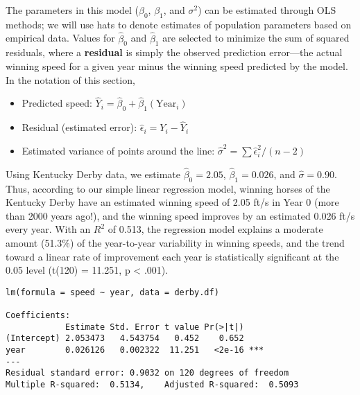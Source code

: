 \documentclass[
]{krantz}
\providecommand{\tightlist}{%
  \setlength{\itemsep}{0pt}\setlength{\parskip}{0pt}}
\begin{document}
The parameters in this model (\(\beta_{0}\), \(\beta_{1}\), and \(\sigma^2\)) can be estimated through OLS methods; we will use hats to denote estimates of population parameters based on empirical data. Values for \(\hat{\beta}_{0}\) and \(\hat{\beta}_{1}\) are selected to minimize the sum of squared residuals, where a \textbf{residual} is simply the observed prediction error---the actual winning speed for a given year minus the winning speed predicted by the model. In the notation of this section,

\begin{itemize}
\tightlist
\item
  Predicted speed: \(\hat{Y}_{i}=\hat{\beta}_{0}+\hat{\beta}_{1}(\textrm{Year}_{i})\)
\item
  Residual (estimated error): \(\hat{\epsilon}_{i}=Y_{i} - \hat{Y}_{i}\)
\item
  Estimated variance of points around the line: \(\hat{\sigma}^2 = \sum \hat{\epsilon}^2_{i} / (n-2)\)
\end{itemize}

Using Kentucky Derby data, we estimate \(\hat{\beta}_{0}=2.05\), \(\hat{\beta}_{1}=0.026\), and \(\hat{\sigma}=0.90\). Thus, according to our simple linear regression model, winning horses of the Kentucky Derby have an estimated winning speed of 2.05 ft/s in Year 0 (more than 2000 years ago!), and the winning speed improves by an estimated 0.026 ft/s every year. With an \(R^2\) of 0.513, the regression model explains a moderate amount (51.3\%) of the year-to-year variability in winning speeds, and the trend toward a linear rate of improvement each year is statistically significant at the 0.05 level (t(120) = 11.251, p \textless{} .001).

\begin{verbatim}
lm(formula = speed ~ year, data = derby.df)

Coefficients:
            Estimate Std. Error t value Pr(>|t|)    
(Intercept) 2.053473   4.543754   0.452    0.652    
year        0.026126   0.002322  11.251   <2e-16 ***
---
Residual standard error: 0.9032 on 120 degrees of freedom
Multiple R-squared:  0.5134,    Adjusted R-squared:  0.5093 
\end{verbatim}
\end{document}
